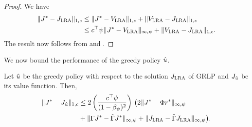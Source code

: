 \begin{proof}
We have
\begin{align}
\|J^*-J_{\text{\sc LRA}}\|_{1,c}\nonumber
&\leq\|J^*-V_{\text{\sc LRA}}\|_{1,c}+\|V_{\text{\sc LRA}}-J_{\text{\sc LRA}}\|_{1,c}\nonumber\\
&\leq c^\top \psi \|J^*-V_{\text{\sc LRA}}\|_{\infty,\psi}+\|V_{\text{\sc LRA}}-J_{\text{\sc LRA}}\|_{1,c}.\nonumber
\end{align}
The result now follows from  and .
\end{proof}

We now bound the performance of the greedy policy $\hat{u}$.
\begin{theorem}
\label{polthe}
Let $\hat{u}$ be the greedy policy with respect to the solution $J_{\text{\sc LRA}}$ of GRLP and $J_{\hat{u}}$ be its value function.
Then,
\begin{align}\label{polthebnd}
\norm{J^* - J_{\hu}}_{1,c}
&\leq 2\left(\frac{c^\top \psi}{(1-\beta_{\psi})^2}\right)\, \big( 2\norm{J^*-\Phi r^*}_{\mn}
\nn\\&
+\norm{\Gamma J^*-\hg J^*}_{\mn}+\norm{\hj-\hg\hj}_{\mn}\big).
\end{align}
\end{theorem}
